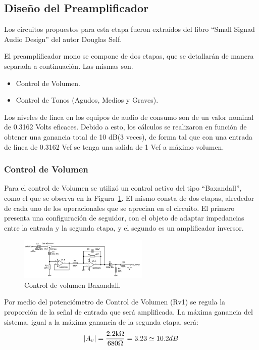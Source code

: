 \subsection{Diseño del Preamplificador}

Los circuitos propuestos para esta etapa fueron extraídos del libro “Small Signad Audio Design” del autor Douglas Self.

El preamplificador mono se compone de dos etapas, que se detallarán de manera separada a continuación. Las mismas son.

\begin{itemize}
\item Control de Volumen.
\item Control de Tonos (Agudos, Medios y Graves).
\end{itemize}

Los niveles de línea en los equipos de audio de consumo son de un valor nominal de 0.3162 Volts eficaces. Debido a esto, los cálculos se realizaron en función de obtener una ganancia total de 10 dB(3 veces), de forma tal que con una entrada de línea de 0.3162 Vef se tenga una salida de 1 Vef a máximo volumen.

\subsubsection{Control de Volumen}

Para el control de Volumen se utilizó un control activo del tipo “Baxandall”, como el que se observa en la Figura~\ref{ctrl_vol}. El mismo consta de dos etapas, alrededor de cada uno de los operacionales que se aprecian en el circuito. El primero presenta una configuración de seguidor, con el objeto de adaptar impedancias entre la entrada y la segunda etapa, y el segundo es un amplificador inversor.


\begin{figure}[H]
\centering
\includegraphics[width=0.55\textwidth]{img/ctrl_vol.png}
\caption{Control de volumen Baxandall.}
\label{ctrl_vol} 
\end{figure}


Por medio del potenciómetro de Control de Volumen (Rv1) se regula la proporción de la señal de entrada que será amplificada.
La máxima ganancia del sistema, igual a la máxima ganancia de la segunda etapa, será: 
$$
\vert A_v \vert = \frac{2.2 \mbox{k}\Omega}{680 \Omega}=3.23\simeq10.2dB
$$

